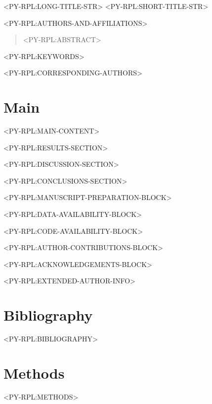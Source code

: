 \documentclass[times, twoside]{rxiv_maker_style}
\begin{document}
<PY-RPL:LONG-TITLE-STR>
<PY-RPL:SHORT-TITLE-STR>

<PY-RPL:AUTHORS-AND-AFFILIATIONS>

\maketitle

\begin{abstract}

<PY-RPL:ABSTRACT>

\end{abstract}

<PY-RPL:KEYWORDS>

<PY-RPL:CORRESPONDING-AUTHORS>

\section*{Main}
<PY-RPL:MAIN-CONTENT>

<PY-RPL:RESULTS-SECTION>

<PY-RPL:DISCUSSION-SECTION>

<PY-RPL:CONCLUSIONS-SECTION>

\vspace{1em}

<PY-RPL:MANUSCRIPT-PREPARATION-BLOCK>

<PY-RPL:DATA-AVAILABILITY-BLOCK>

<PY-RPL:CODE-AVAILABILITY-BLOCK>

<PY-RPL:AUTHOR-CONTRIBUTIONS-BLOCK>

<PY-RPL:ACKNOWLEDGEMENTS-BLOCK>

\begin{exauthor}
<PY-RPL:EXTENDED-AUTHOR-INFO>
\end{exauthor}

\section*{Bibliography}
<PY-RPL:BIBLIOGRAPHY>

\section*{Methods}
<PY-RPL:METHODS>

\onecolumn
\newpage



\end{document}
